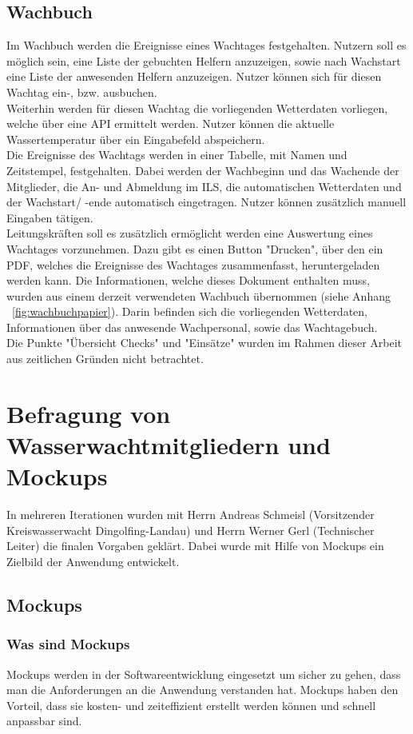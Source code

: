 \documentclass[fontsize=12pt,openright,oneside,paper=a4,BCOR=1cm]{scrbook}
\begin{document}
\subsection{Wachbuch}
Im Wachbuch werden die Ereignisse eines Wachtages festgehalten. Nutzern soll es möglich sein, eine Liste der gebuchten Helfern anzuzeigen, sowie nach Wachstart eine Liste der anwesenden Helfern anzuzeigen. Nutzer können sich für diesen Wachtag ein-, bzw. ausbuchen. \\
Weiterhin werden für diesen Wachtag die vorliegenden Wetterdaten vorliegen, welche über eine API ermittelt werden. Nutzer können die aktuelle Wassertemperatur über ein Eingabefeld abspeichern. \\
Die Ereignisse des Wachtags werden in einer Tabelle, mit Namen und Zeitstempel, festgehalten. Dabei werden der Wachbeginn und das Wachende der Mitglieder, die An- und Abmeldung im ILS, die automatischen Wetterdaten und der Wachstart/ -ende automatisch eingetragen. Nutzer können zusätzlich manuell Eingaben tätigen. \\
Leitungskräften soll es zusätzlich ermöglicht werden eine Auswertung eines Wachtages vorzunehmen. Dazu gibt es einen Button "Drucken", über den ein PDF, welches die Ereignisse des Wachtages zusammenfasst, heruntergeladen werden kann. Die Informationen, welche dieses Dokument enthalten muss, wurden aus einem derzeit verwendeten Wachbuch übernommen (siehe Anhang ~\ref{fig:wachbuchpapier}). Darin befinden sich die vorliegenden Wetterdaten, Informationen über das anwesende Wachpersonal, sowie das Wachtagebuch. \\
Die Punkte "Übersicht Checks" und "Einsätze" wurden im Rahmen dieser Arbeit aus zeitlichen Gründen nicht betrachtet. 

\section{Befragung von Wasserwachtmitgliedern und Mockups}
In mehreren Iterationen wurden mit Herrn Andreas Schmeisl (Vorsitzender Kreiswasserwacht Dingolfing-Landau) und Herrn Werner Gerl (Technischer Leiter) die finalen Vorgaben geklärt. Dabei wurde mit Hilfe von Mockups ein Zielbild der Anwendung entwickelt. 
\subsection{Mockups}
\subsubsection{Was sind Mockups}
Mockups werden in der Softwareentwicklung eingesetzt um sicher zu gehen, dass man die Anforderungen an die Anwendung verstanden hat. Mockups haben den Vorteil, dass sie kosten- und zeiteffizient erstellt werden können und schnell anpassbar sind.
\end{document}
